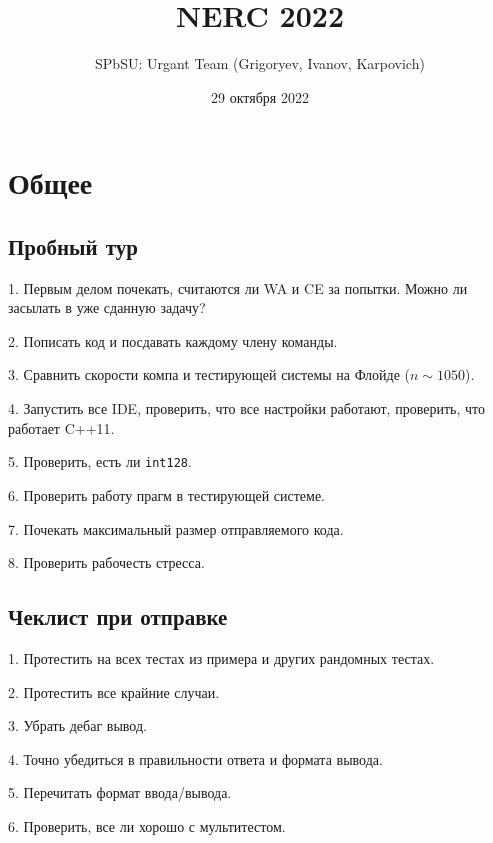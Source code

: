 \documentclass[10pt, portrait,letterpaper]{article}
\title{NERC 2022}
\date{29 октября 2022}
\author{SPbSU: Urgant Team (Grigoryev, Ivanov, Karpovich) }
\begin{document}
\tableofcontents
\onecolumn


\section{Общее}

\subsection{Пробный тур}

1. Первым делом почекать, считаются ли WA и CE за попытки. Можно ли засылать в уже сданную задачу?

2. Пописать код и посдавать каждому члену команды.

3. Сравнить скорости компа и тестирующей системы на Флойде ($n \sim 1050$).

4. Запустить все IDE, проверить, что все настройки работают, проверить, что работает C++11.

5. Проверить, есть ли \texttt{int128}.

6. Проверить работу прагм в тестирующей системе.

7. Почекать максимальный размер отправляемого кода.

8. Проверить рабочесть стресса.

\subsection{Чеклист при отправке}

1. Протестить на всех тестах из примера и других рандомных тестах.

2. Протестить все крайние случаи.

3. Убрать дебаг вывод.

4. Точно убедиться в правильности ответа и формата вывода.

5. Перечитать формат ввода/вывода.

6. Проверить, все ли хорошо с мультитестом.
\end{document}
